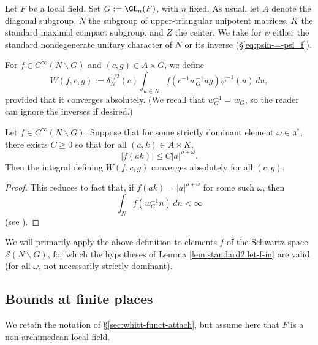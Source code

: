 Let $F$ be a local field.  Set $G := \GL_n(F)$, with $n$ fixed.  As usual, let $A$ denote the diagonal subgroup, $N$ the subgroup of upper-triangular unipotent matrices, $K$ the standard maximal compact subgroup, and $Z$ the center.  We take for $\psi$ either the standard nondegenerate unitary character of $N$ or its inverse (\S\ref{eq:psin-=-psi_f}).

For $f \in C^\infty(N \backslash G)$ and $(c,g) \in A \times G$, we define
\begin{equation*}
  W(f,c,g) := \delta_N^{1/2}(c) \int_{u \in N} f(c^{-1} w^{-1}_G u g) \psi^{-1}(u) \, d u,
\end{equation*}
provided that it converges absolutely.  (We recall that $w_G^{-1} = w_G$, so the reader can ignore the inverses if desired.)

\begin{lemma}\label{lem:standard2:let-f-in}
  Let $f \in C^\infty(N \backslash G)$.  Suppose that for some strictly dominant element $\omega \in \mathfrak{a}^*$, there exists $C \geq 0$ so that for all $(a,k) \in A \times K$,
  \begin{equation}\label{eq:fa-k-leq}
    |f(a k)| \leq C |a|^{\rho + \omega}.
  \end{equation}
  Then the integral defining $W(f,c,g)$ converges absolutely  for all $(c,g)$.
\end{lemma}
\begin{proof}
  This reduces to fact that, if $f(a k) = |a|^{\rho + \omega}$ for some such $\omega$, then
  \begin{equation*}
    \int_{N} f(w^{-1}_G n) \, d n< \infty
  \end{equation*}
  (see \cite[\S10.1.2]{MR1170566}).
\end{proof}
We will primarily apply the above definition to elements $f$ of the Schwartz space $\mathcal{S}(N \backslash G)$, for which the hypotheses of Lemma \ref{lem:standard2:let-f-in} are valid (for all $\omega$, not necessarily strictly dominant).


\subsection{Bounds at finite places}\label{sec:cnjeonep68}
We retain the notation of \S\ref{sec:whitt-funct-attach}, but assume here that $F$ is a non-archimedean local field.

